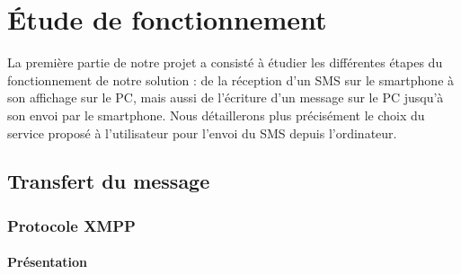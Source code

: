 \cleardoublepage



\chapter{Étude de fonctionnement}

La première partie de notre projet a consisté à étudier les différentes étapes du fonctionnement de notre solution : de la réception d'un SMS sur le smartphone à son affichage sur le PC, mais aussi de l'écriture d'un message sur le PC jusqu'à son envoi par le smartphone.
Nous détaillerons plus précisément le choix du service proposé à l'utilisateur pour l'envoi du SMS depuis l'ordinateur.
\\






\section{Transfert du message}


\subsection{Protocole XMPP}


\subsubsection{Présentation}

